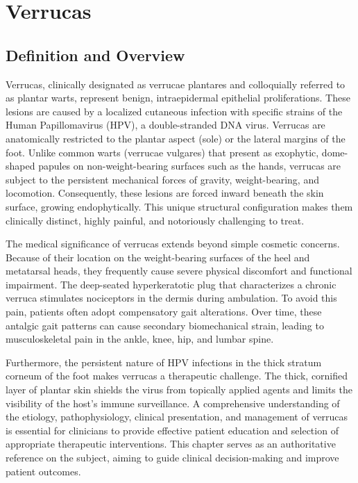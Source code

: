\chapter{Verrucas}

\section*{Definition and Overview}
Verrucas, clinically designated as verrucae plantares and colloquially referred to as plantar warts, represent benign, intraepidermal epithelial proliferations. These lesions are caused by a localized cutaneous infection with specific strains of the Human Papillomavirus (HPV), a double-stranded DNA virus. Verrucas are anatomically restricted to the plantar aspect (sole) or the lateral margins of the foot. Unlike common warts (verrucae vulgares) that present as exophytic, dome-shaped papules on non-weight-bearing surfaces such as the hands, verrucas are subject to the persistent mechanical forces of gravity, weight-bearing, and locomotion. Consequently, these lesions are forced inward beneath the skin surface, growing endophytically. This unique structural configuration makes them clinically distinct, highly painful, and notoriously challenging to treat.

The medical significance of verrucas extends beyond simple cosmetic concerns. Because of their location on the weight-bearing surfaces of the heel and metatarsal heads, they frequently cause severe physical discomfort and functional impairment. The deep-seated hyperkeratotic plug that characterizes a chronic verruca stimulates nociceptors in the dermis during ambulation. To avoid this pain, patients often adopt compensatory gait alterations. Over time, these antalgic gait patterns can cause secondary biomechanical strain, leading to musculoskeletal pain in the ankle, knee, hip, and lumbar spine.

Furthermore, the persistent nature of HPV infections in the thick stratum corneum of the foot makes verrucas a therapeutic challenge. The thick, cornified layer of plantar skin shields the virus from topically applied agents and limits the visibility of the host's immune surveillance. A comprehensive understanding of the etiology, pathophysiology, clinical presentation, and management of verrucas is essential for clinicians to provide effective patient education and selection of appropriate therapeutic interventions. This chapter serves as an authoritative reference on the subject, aiming to guide clinical decision-making and improve patient outcomes.


